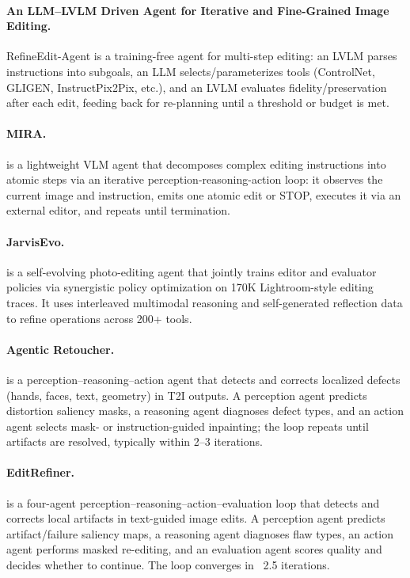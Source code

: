 \paragraph{An LLM--LVLM Driven Agent for Iterative and Fine-Grained Image Editing.}
RefineEdit-Agent is a training-free agent for multi-step editing: an LVLM parses instructions into subgoals, an LLM selects/parameterizes tools (ControlNet, GLIGEN, InstructPix2Pix, etc.), and an LVLM evaluates fidelity/preservation after each edit, feeding back for re-planning until a threshold or budget is met. ~\cite{avg250817435}

\paragraph{MIRA.}
 is a lightweight VLM agent that decomposes complex editing instructions into atomic steps via an iterative perception-reasoning-action loop: it observes the current image and instruction, emits one atomic edit or STOP, executes it via an external editor, and repeats until termination. ~\cite{avg251121087}

\paragraph{JarvisEvo.}
 is a self-evolving photo-editing agent that jointly trains editor and evaluator policies via synergistic policy optimization on 170K Lightroom-style editing traces. It uses interleaved multimodal reasoning and self-generated reflection data to refine operations across 200+ tools. ~\cite{avg251123002}

\paragraph{Agentic Retoucher.}
 is a perception–reasoning–action agent that detects and corrects localized defects (hands, faces, text, geometry) in T2I outputs. A perception agent predicts distortion saliency masks, a reasoning agent diagnoses defect types, and an action agent selects mask- or instruction-guided inpainting; the loop repeats until artifacts are resolved, typically within 2–3 iterations. ~\cite{avg260102046}

\paragraph{EditRefiner.}
 is a four-agent perception–reasoning–action–evaluation loop that detects and corrects local artifacts in text-guided image edits. A perception agent predicts artifact/failure saliency maps, a reasoning agent diagnoses flaw types, an action agent performs masked re-editing, and an evaluation agent scores quality and decides whether to continue. The loop converges in ~2.5 iterations. ~\cite{avg260507457}

